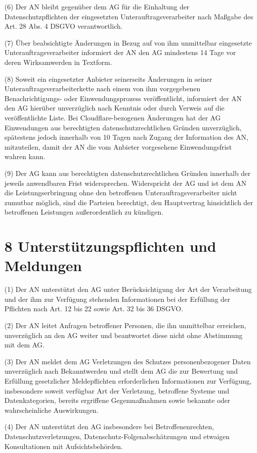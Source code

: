 \documentclass[11pt,a4paper]{article}
\begin{document}
(6) Der AN bleibt gegenüber dem AG für die Einhaltung der Datenschutzpflichten der eingesetzten Unterauftragsverarbeiter nach Maßgabe des Art. 28 Abs. 4 DSGVO verantwortlich.

(7) Über beabsichtigte Änderungen in Bezug auf von ihm unmittelbar eingesetzte Unterauftragsverarbeiter informiert der AN den AG mindestens 14 Tage vor deren Wirksamwerden in Textform.

(8) Soweit ein eingesetzter Anbieter seinerseits Änderungen in seiner Unterauftragsverarbeiterkette nach einem von ihm vorgegebenen Benachrichtigungs- oder Einwendungsprozess veröffentlicht, informiert der AN den AG hierüber unverzüglich nach Kenntnis oder durch Verweis auf die veröffentlichte Liste. Bei Cloudflare-bezogenen Änderungen hat der AG Einwendungen aus berechtigten datenschutzrechtlichen Gründen unverzüglich, spätestens jedoch innerhalb von 10 Tagen nach Zugang der Information des AN, mitzuteilen, damit der AN die vom Anbieter vorgesehene Einwendungsfrist wahren kann.

(9) Der AG kann aus berechtigten datenschutzrechtlichen Gründen innerhalb der jeweils anwendbaren Frist widersprechen. Widerspricht der AG und ist dem AN die Leistungserbringung ohne den betroffenen Unterauftragsverarbeiter nicht zumutbar möglich, sind die Parteien berechtigt, den Hauptvertrag hinsichtlich der betroffenen Leistungen außerordentlich zu kündigen.

\section*{8 Unterstützungspflichten und Meldungen}
(1) Der AN unterstützt den AG unter Berücksichtigung der Art der Verarbeitung und der ihm zur Verfügung stehenden Informationen bei der Erfüllung der Pflichten nach Art. 12 bis 22 sowie Art. 32 bis 36 DSGVO.

(2) Der AN leitet Anfragen betroffener Personen, die ihn unmittelbar erreichen, unverzüglich an den AG weiter und beantwortet diese nicht ohne Abstimmung mit dem AG.

(3) Der AN meldet dem AG Verletzungen des Schutzes personenbezogener Daten unverzüglich nach Bekanntwerden und stellt dem AG die zur Bewertung und Erfüllung gesetzlicher Meldepflichten erforderlichen Informationen zur Verfügung, insbesondere soweit verfügbar Art der Verletzung, betroffene Systeme und Datenkategorien, bereits ergriffene Gegenmaßnahmen sowie bekannte oder wahrscheinliche Auswirkungen.

(4) Der AN unterstützt den AG insbesondere bei Betroffenenrechten, Datenschutzverletzungen, Datenschutz-Folgenabschätzungen und etwaigen Konsultationen mit Aufsichtsbehörden.
\end{document}
